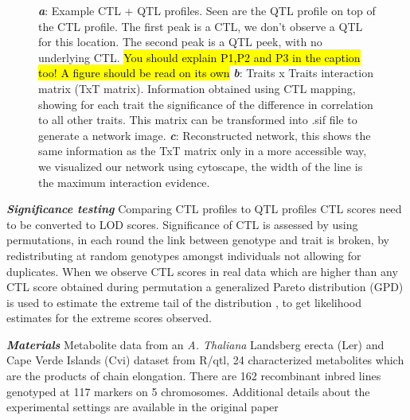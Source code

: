 \documentclass{bioinfo}
\begin{document}
\begin{figure}[ht]
\begin{center}
{      \label{subfigc}
    }
  \end{center}
  \begin{minipage}{7in}
  \label{newplots}
  \vspace{-0.7cm}
  \caption[Plots]{
  {\emph {\bf a}}: Example CTL + QTL profiles. Seen are the QTL profile on top of the CTL profile. 
  The first peak is a CTL, we don't observe a QTL for this location.
  The second peak is a QTL peek, with no underlying CTL. \hl{You
  should explain P1,P2 and P3 in the caption too! A figure should be
  read on its own} 
  {\emph {\bf b}}: Traits x Traits interaction matrix (TxT matrix). Information obtained using CTL mapping, 
  showing for each trait the significance of the difference in correlation to all other traits. This 
  matrix can be transformed into .sif file to generate a network image. 
  {\emph {\bf c}}:  Reconstructed network, this shows the same information as the TxT matrix only in a more accessible way, we visualized our 
  network using cytoscape, the width of the line is the maximum interaction evidence.
 }
\end{minipage}
\vspace{-0.5cm}
\end{figure}

\emph{ {\bf Significance testing}}
  Comparing CTL profiles to QTL profiles CTL scores need to be converted to LOD scores. Significance 
  of CTL is assessed by using permutations, in each round the link between genotype and 
  trait is broken, by redistributing at random genotypes amongst individuals not 
  allowing for duplicates. When we observe CTL scores in real data which are higher than any 
  CTL score obtained during permutation a generalized Pareto distribution (GPD) is used to 
  estimate the extreme tail of the distribution \cite{Knijnenburg:2009}, to get likelihood estimates for the 
  extreme scores observed.

\emph{ {\bf Materials}}
  Metabolite data from an \emph{A. Thaliana} Landsberg erecta (Ler) and Cape Verde Islands (Cvi) 
  dataset from R/qtl, 24 characterized metabolites which are the products of chain elongation. 
  There are 162 recombinant inbred lines genotyped at 117 markers on 5 chromosomes. Additional 
  details about the experimental settings are available in the original paper \cite{Keurentjes:2006,AlonsoBlanco:1998}
\vspace{-0.6cm}
\end{document}
